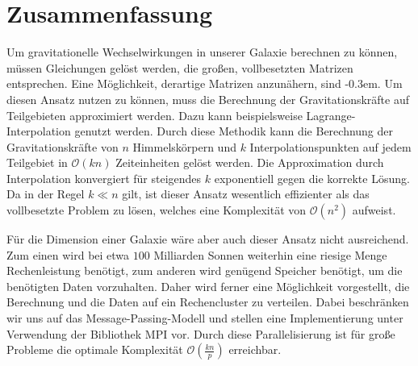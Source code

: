 \chapter*{Zusammenfassung}
  Um gravitationelle Wechselwirkungen in unserer Galaxie berechnen zu können, müssen Gleichungen gelöst werden, die großen, vollbesetzten Matrizen entsprechen. Eine Möglichkeit, derartige Matrizen
  anzunähern, sind \hquad \kern-0.3em. Um diesen Ansatz nutzen zu können, muss die Berechnung der Gravitationskräfte auf Teilgebieten approximiert werden. Dazu kann beispielsweise Lagrange-Interpolation
  genutzt werden. Durch diese Methodik kann die Berechnung der Gravitationskräfte von $n$ Himmelskörpern und $k$ Interpolationspunkten auf jedem Teilgebiet in $\mathcal{O}(kn)$ Zeiteinheiten gelöst 
  werden. Die Approximation durch Interpolation konvergiert für steigendes $k$ exponentiell gegen die korrekte Lösung. Da in der Regel $k \ll n$ gilt, ist dieser Ansatz wesentlich effizienter als das 
  vollbesetzte Problem zu lösen, welches eine Komplexität von $\mathcal{O}(n^2)$ aufweist.
  
  Für die Dimension einer Galaxie wäre aber auch dieser Ansatz nicht ausreichend. Zum einen wird bei etwa $100$ Milliarden Sonnen weiterhin eine riesige Menge Rechenleistung benötigt, zum anderen
  wird genügend Speicher benötigt, um die benötigten Daten vorzuhalten. 
  Daher wird ferner eine Möglichkeit vorgestellt, die Berechnung und die Daten auf ein Rechencluster zu verteilen. Dabei beschränken wir uns auf das Message-Passing-Modell
  und stellen eine Implementierung unter Verwendung der Bibliothek MPI vor.  
  Durch diese Parallelisierung ist für große Probleme die optimale Komplexität $\mathcal{O}(\frac{kn}{p})$ erreichbar.